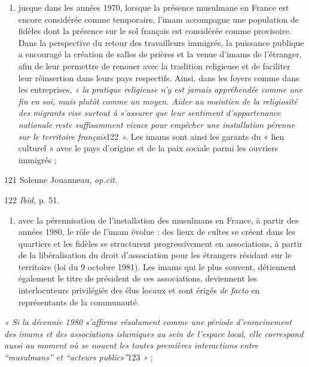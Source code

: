 \begin{enumerate}
\def\labelenumi{\arabic{enumi}.}
\item
  jusque dans les années 1970, lorsque la présence musulmane en France
  est encore considérée comme temporaire, l'imam accompagne une
  population de fidèles dont la présence sur le sol français est
  considérée comme provisoire. Dans la perspective du retour des
  travailleurs immigrés, la puissance publique a encouragé la création
  de salles de prières et la venue d'imams de l'étranger, afin de leur
  permettre de renouer avec la tradition religieuse et de faciliter leur
  réinsertion dans leurs pays respectifs. Ainsi, dans les foyers comme
  dans les entreprises, \emph{« la pratique religieuse n'y est jamais
  appréhendée comme une fin en soi, mais plutôt comme un moyen. Aider au
  maintien de la religiosité des migrants vise surtout à s'assurer que
  leur sentiment d'appartenance nationale reste suffisamment vivace pour
  empêcher une installation pérenne sur le territoire français}122
  \emph{».} Les imams sont ainsi les garants du « lien culturel » avec
  le pays d'origine et de la paix sociale parmi les ouvriers immigrés ;
\end{enumerate}


121 Solenne Jouanneau, \emph{op.cit.}

122 \emph{Ibid,} p. 51.




\begin{enumerate}
\def\labelenumi{\arabic{enumi}.}
\setcounter{enumi}{1}
\item
  
  avec la pérennisation de l'installation des musulmans en France, à
  partir des années 1980, le rôle de l'imam évolue : des lieux de cultes
  se créent dans les quartiers et les fidèles se structurent
  progressivement en associations, à partir de la libéralisation du
  droit d'association pour les étrangers résidant sur le territoire (loi
  du 9 octobre 1981). Les imams qui le plus souvent, détiennent
  également le titre de président de ces associations, deviennent les
  interlocuteurs privilégiés des élus locaux et sont érigés \emph{de
  facto} en représentants de la communauté.
  
\end{enumerate}


\emph{« Si la décennie 1980 s'affirme résolument comme une période
d'enracinement des imams et des associations islamiques au sein de
l'espace local, elle correspond aussi au moment où se nouent les toutes
premières interactions entre ``musulmans'' et ``acteurs publics''}123
\emph{»} ;


